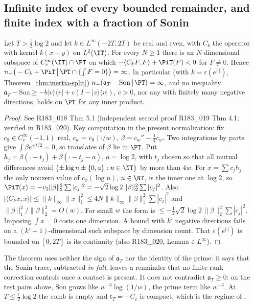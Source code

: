 \subsection{Infinite index of every bounded remainder, and finite index with a fraction of Sonin}

\begin{theorem}\label{thm:inertia-nogo}
Let $T>\frac12\log2$ and let $k\in L^\infty(-2T,2T)$ be real and even, with $C_k$ the operator with kernel
$k(x-y)$ on $L^2(\IT)$. For every $N\ge1$ there is an $N$-dimensional subspace of
$C_c^\infty(\IT)\cap\PT$ on which $-\langle C_kF,F\rangle+\PiT(F)<0$ for $F\ne0$. Hence
$n_-\big(-C_k+\PiT\,\big|\,\PT\cap\{\int F=0\}\big)=\infty$. In particular (with $k=\varepsilon(e^{|\cdot|})$,
Theorem~\ref{thm:inertia-split}) $n_-(\mathfrak a_T-\mathrm{Son}\,|\,\PT)=\infty$, and no inequality
$\mathfrak a_T-\mathrm{Son}\ge-b|v\rangle\langle v|+c(I-|v\rangle\langle v|)$, $c>0$, nor any with finitely many
negative directions, holds on $\PT$ for any inner product.
\end{theorem}
\begin{proof}
See R183\_018 Thm 5.1 (independent second proof R183\_019 Thm 4.1; verified in R183\_020). Key computation in
the present normalization: fix $c_0\in C_c^\infty(-1,1)$ real, $c_w=c_0(\cdot/w)$, $\beta=c_w''-\frac14c_w$. Two
integrations by parts give $\int\beta e^{\pm t/2}=0$, so translates of $\beta$ lie in $\PT$. Put
$h_j=\beta(\cdot-t_j)+\beta(\cdot-t_j-a)$, $a=\log2$, with $t_j$ chosen so that all mutual differences avoid
$\{\pm\log n\pm\{0,a\}:n\in\NT\}$ by more than $4w$. For $x=\sum c_jh_j$ the only nonzero value of $c_x(\log n)$,
$n\in\NT$, is the inner one at $\log2$, so $\PiT(x)=-v_2\|\beta\|_2^2\sum|c_j|^2=-\sqrt2\log2\,\|\beta\|_2^2\sum|c_j|^2$.
Also $|\langle C_kx,x\rangle|\le\|k\|_\infty\|x\|_1^2\le4N\|k\|_\infty\|\beta\|_1^2\sum|c_j|^2$ and
$\|\beta\|_1^2/\|\beta\|_2^2=O(w)$. For small $w$ the form is $\le-\frac12\sqrt2\log2\,\|\beta\|_2^2\sum|c_j|^2$.
Imposing $\int x=0$ costs one dimension. A bound with $k'$ negative directions fails on a $(k'+1)$-dimensional
such subspace by dimension count. That $\varepsilon(e^{|\cdot|})$ is bounded on $[0,2T]$ is its continuity
\cite[(84)]{ConnesConsani2021} (also R183\_020, Lemma $\varepsilon$-$L^\infty$).
\end{proof}
\begin{remark}
The theorem uses neither the sign of $\mathfrak a_T$ nor the identity of the prime: it says that the Sonin
trace, subtracted \emph{in full}, leaves a remainder that no finite-rank correction controls once a contact is
present. It does not contradict $\mathfrak a_T\ge0$: on the test pairs above,
$\mathrm{Son}$ grows like $w^{-3}\log(1/w)$, the prime term like $w^{-3}$. At $T\le\frac12\log2$ the comb is
empty and $\mathfrak r_T=-C_\varepsilon$ is compact, which is the regime of \cite[\S6]{ConnesConsani2021}.
\end{remark}

